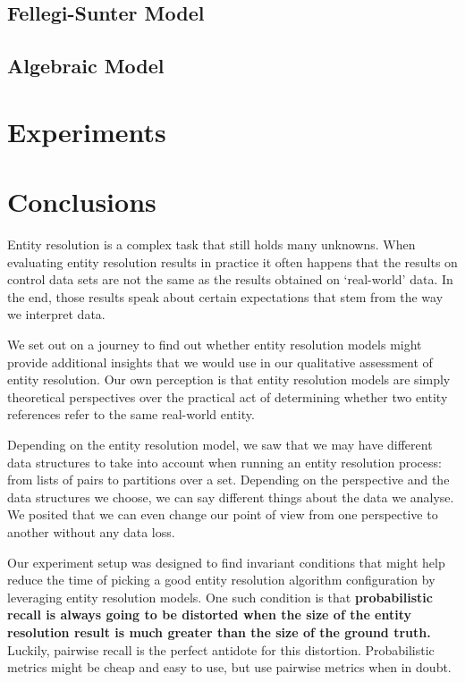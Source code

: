 \documentclass[journal]{IEEEtran}
\begin{document}
    \subsection[fsm]{Fellegi-Sunter Model}\label{subsec:fsm}
    

    \subsection[algebraic]{Algebraic Model}\label{subsec:algebraic}
    

    \section{Experiments}\label{sec:experiments}
    

    \section[conclusion]{Conclusions}\label{sec:conclusions}

    Entity resolution is a complex task that still holds many unknowns.
    When evaluating entity resolution results in practice it often happens that
    the results on control data sets are not the same as the results obtained
    on `real-world' data.
    In the end, those results speak about certain expectations that stem from
    the way we interpret data.

    We set out on a journey to find out whether entity resolution models might
    provide additional insights that we would use in our qualitative assessment
    of entity resolution.
    Our own perception is that entity resolution models are simply theoretical
    perspectives over the practical act of determining whether two entity
    references refer to the same real-world entity.

    Depending on the entity resolution model, we saw that we may have different
    data structures to take into account when running an entity resolution
    process: from lists of pairs to partitions over a set.
    Depending on the perspective and the data structures we choose, we can say
    different things about the data we analyse.
    We posited that we can even change our point of view from one perspective to
    another without any data loss.

    Our experiment setup was designed to find invariant conditions that might
    help reduce the time of picking a good entity resolution algorithm
    configuration by leveraging entity resolution models.
    One such condition is that \textbf{probabilistic recall is always going to
    be distorted when the size of the entity resolution result is much greater
    than the size of the ground truth.}
    Luckily, pairwise recall is the perfect antidote for this distortion.
    Probabilistic metrics might be cheap and easy to use, but use pairwise
    metrics when in doubt.
\end{document}
